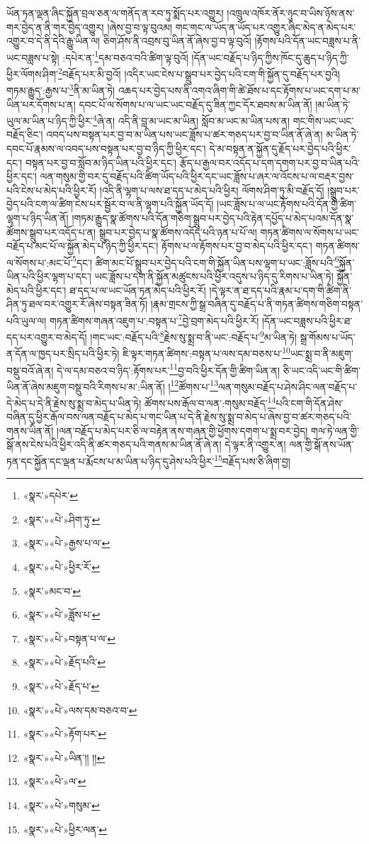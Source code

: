 ཡོན་ཏན་ལྡན་ཞིང་སྐྱོན་བྲལ་ཅན་ལ་གནོད་ན་རབ་ཏུ་སྨོད་པར་འགྱུར། །འཁྲུལ་འཁོར་ནོར་ཉུང་བ་ཡིས་ཉོས་ནས་གར་བྱེད་ན་ནི་གར་བྱེད་འགྱུར། །ཞེས་བྱ་བ་ལྟ་བུའམ། གང་གང་ལ་ཡོད་ན་ཡོད་པར་འགྱུར་ཞིང་མེད་ན་མེད་པར་འགྱུར་བ་དེ་ནི་དེའི་རྒྱུ་ཡིན་ལ། ཅིག་ཤོས་ནི་འབྲས་བུ་ཡིན་ནོ་ཞེས་བྱ་བ་ལྟ་བུའོ། །རྟོགས་པའི་དོན་ཡང་བཟླས་པ་ནི་ཡང་བཟླས་པ་སྟེ། :དཔེར་ན་\footnote{«སྣར་»དཔེར་}དམ་བཅའ་བའི་ཚིག་ལྟ་བུའོ། །དོན་ཡང་བརྗོད་པ་ཉིད་ཀྱིས་ཁོང་དུ་ཆུད་པ་ཉིད་ཀྱི་ཕྱིར་ལོགས་ཤིག་\footnote{«སྣར་»«པེ་»ཤིག་ཏུ་}བརྗོད་པར་མི་བྱའོ། །འདིར་ཡང་ངེས་པ་སྒྲུབ་པར་བྱེད་པའི་ངག་གི་སྐྱོན་དུ་བརྗོད་པར་བྱའི། གཏམ་རྒྱུད་:རྒྱས་པ་\footnote{«སྣར་»«པེ་»རྒྱས་པ་ལ་}ནི་མ་ཡིན་ཏེ། འཆད་པར་བྱེད་པས་ནི་འགའ་ཞིག་གི་ཚེ་ཐོས་པ་དང་རྟོགས་པ་ཡང་དག་པ་མ་ཡིན་པར་དོགས་པ་ན། དབང་པོ་ལ་སོགས་པ་ལ་ཡང་ཡང་བརྗོད་དུ་ཟིན་ཀྱང་དོར་ཐབས་མ་ཡིན་ནོ། །མ་ཡིན་ཏེ་ཡུལ་མ་ཡིན་པ་ཉིད་ཀྱི་ཕྱིར་\footnote{«སྣར་»«པེ་»ཕྱིར་རོ་}ཞེ་ན། འདི་ནི་བླ་མ་ཡང་མ་ཡིན། སློབ་མ་ཡང་མ་ཡིན་པས་ན། གང་གིས་ཡང་ཡང་བརྗོད་ཅིང་། འབད་པས་བསྟན་པར་བྱ་བ་མ་ཡིན་པས་ཡང་ཟློས་པ་ཚར་གཅད་པར་བྱ་བ་ཡིན་ནོ་ཞེ་ན། མ་ཡིན་ཏེ་དབང་པོ་རྣམས་ལ་འབད་པས་བསྟན་པར་བྱ་བ་ཉིད་ཀྱི་ཕྱིར་དང་། དེ་མ་བསྟན་ན་སྐྱོན་དུ་རྗོད་པར་བྱེད་པའི་ཕྱིར་དང་། བསྟན་པར་བྱ་བ་སློབ་མ་ཉིད་ཡིན་པའི་ཕྱིར་དང་། རྩོད་པ་རྒྱལ་བར་འདོད་པ་དག་དགག་པར་བྱ་བ་ཡིན་པའི་ཕྱིར་དང་། ལན་གསུམ་གྱི་བར་དུ་བརྗོད་པའི་ཚིག་ཡོད་པའི་ཕྱིར་དང་ཡང་ཟློས་པ་ཞར་ལ་འོངས་པ་ལ་བརྡར་བྱས་པའི་ངེས་པ་མེད་པའི་ཕྱིར་རོ། །འདི་ནི་ལྷག་པ་ལས་ཐ་དད་པ་མེད་པའི་ཕྱིར། ལོགས་ཤིག་ཏུ་མི་བརྗོད་དོ། །སྒྲུབ་པར་བྱེད་པའི་ངག་ལ་ཚིག་ངེས་པར་སྦྱོར་བ་ལ་ནི་ལྷག་པའི་སྐྱོན་ཡོད་དོ། །ཡང་ཟློས་པ་ལ་ཡང་རྟོགས་པའི་དོན་གྱི་ཚིག་ལྷག་པ་ཉིད་ཡིན་ནོ། །གཏམ་རྒྱུད་སྣ་ཚོགས་པའི་དོན་གཅིག་སྒྲུབ་པར་བྱེད་པའི་རྟེན་དཔྱོད་པ་མེད་པའམ་དོན་སྣ་ཚོགས་སྒྲུབ་པར་འདོད་པ་ན། སྒྲུབ་པར་བྱེད་པ་སྣ་ཚོགས་འདོད་པའི་ཉན་པ་པོ་ལ། གཏན་ཚིགས་ལ་སོགས་པ་ཡང་བརྗོད་པ་མང་པོ་ལ་སྐྱོན་མེད་པ་ཉིད་ཀྱི་ཕྱིར་དང་། རྟོགས་པ་ལ་རྟོགས་པར་བྱ་བ་མེད་པའི་ཕྱིར་དང་། གཏན་ཚིགས་ལ་སོགས་པ་:མང་པོ་\footnote{«སྣར་»མང་བ་}དང་། ཚིག་མང་པོ་སྒྲུབ་པར་བྱེད་པའི་ངག་གི་སྐྱོན་ཡིན་པས་ལྷག་པ་ཡང་:ཟློས་པའི་\footnote{«སྣར་»«པེ་»ཟློས་པ་}སྐྱོན་ཡིན་པའི་ཕྱིར་ལྷག་པ་དང་། ཡང་ཟློས་པ་དག་ནི་སྐྱོན་མཚུངས་པའི་ཕྱིར་འདུས་པ་ཉིད་དུ་རིགས་པ་ཡིན་ཏེ། སྐྱོན་མེད་པའི་ཕྱིར་དང་། ཐ་དད་པ་ལ་ཡང་ཡོན་ཏན་མེད་པའི་ཕྱིར་རོ། །དེ་ལྟར་ན་ཐ་དད་པའི་རྣམ་པ་དག་གི་ཚིག་ནི་ཤིན་ཏུ་ཐལ་བར་འགྱུར་རོ་ཞེས་བསྟན་ཟིན་ཏོ། །རྣམ་གྲངས་ཀྱི་སྒྲ་བཞིན་དུ་བརྗོད་པ་ནི་གཏན་ཚིགས་གཅིག་བསྟན་པའི་ཡུལ་ལ། གཏན་ཚིགས་གཞན་འཇུག་པ་:བསྟན་པ་\footnote{«སྣར་»«པེ་»བསྟན་པ་ལ་}བྱེ་བྲག་མེད་པའི་ཕྱིར་རོ། །དོན་ཡང་བཟླས་པའི་ཕྱིར་ཐ་དད་པར་འགྱུར་བ་མེད་དོ། །གང་ཡང་:བརྗོད་པའི་\footnote{«སྣར་»«པེ་»རྗོད་པའི་}རྗེས་སུ་སྨྲ་བ་ནི་ཡང་:བརྗོད་པ་\footnote{«སྣར་»«པེ་»རྗོད་པ་}མ་ཡིན་ཏེ། སྒྲ་གོམས་པ་ཡོད་ན་དོན་ལ་ཁྱད་པར་སྲིད་པའི་ཕྱིར་ཏེ། ཇི་ལྟར་གཏན་ཚིགས་:བསྟན་པ་ལས་དམ་བཅས་པ་\footnote{«སྣར་»«པེ་»ལས་དམ་བཅའ་བ་}ཡང་སྨྲ་བ་ནི་མཇུག་བསྡུ་བའོ་ཞེ་ན། དེ་ལ་དམ་བཅའ་བ་ཉིད་:རྟོགས་པར་\footnote{«སྣར་»«པེ་»རྟོག་པར་}བྱ་བའི་ཕྱིར་དོན་གྱི་ཚིག་ཡིན་ན། ཅི་ཡང་འདི་ཡང་གི་ཚིག་ཡིན་ནོ་ཞེས་མཇུག་བསྡུ་བའི་རིགས་པ་མ་:ཡིན་ནོ། །\footnote{«སྣར་»«པེ་»ཡིན་།། །།}ཚོགས་པ་\footnote{«སྣར་»«པེ་»ལ་}ལན་གསུམ་བརྗོད་པ་ཤེས་ཤིང་ལན་བརྗོད་པ་དེ་མེད་པ་དེ་ནི་རྗེས་སུ་སྨྲ་བ་མེད་པ་ཡིན་ཏེ། ཚོགས་པས་རྒོལ་བ་ལན་:གསུམ་བརྗོད་\footnote{«སྣར་»«པེ་»གསུམ་}པའི་ངག་གི་དོན་ཤེས་བཞིན་དུ་ཕྱིར་རྒོལ་བས་ལན་བརྗོད་པ་མེད་པ་གང་ཡིན་པ་དེ་ནི་རྗེས་སུ་སྨྲ་བ་མེད་པ་ཞེས་བྱ་བ་ཚར་གཅད་པའི་གནས་ཡིན་ནོ། །ལན་བརྗོད་པ་མེད་པར་ཅི་ལ་བརྟེན་ནས་གཞན་གྱི་ཕྱོགས་དགག་པ་སྨྲ་བར་བྱེད། གལ་ཏེ་ལན་གྱི་སྒོ་ནས་ངེས་པའི་ཕྱིར་འདི་ནི་ཚར་གཅད་པའི་གནས་མ་ཡིན་ནོ་ཞེ་ན། དེ་ལྟར་ནི་འགྱུར་ན། ལན་གྱི་སྒོ་ནས་ཡོན་ཏན་དང་སྐྱོན་དང་ལྡན་པ་རྨོངས་པ་མ་ཡིན་པ་ཉིད་དུ་ཤེས་པའི་ཕྱིར་\footnote{«སྣར་»«པེ་»ཕྱིར་ལན་}བརྗོད་པས་ཅི་ཞིག་བྱ། 